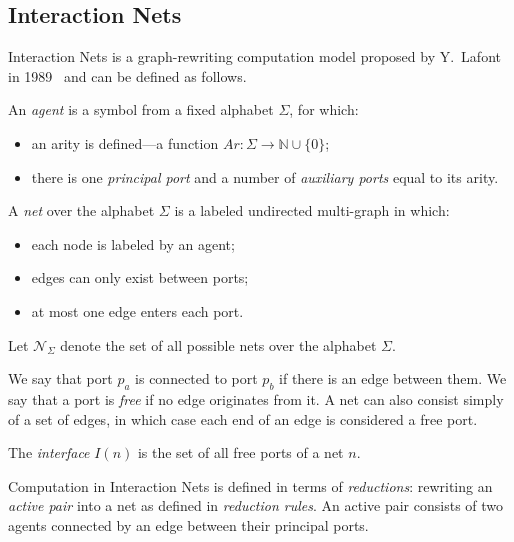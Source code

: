 \subsection{Interaction Nets}\label{sec:interaction_nets}

Interaction Nets is a graph-rewriting computation model proposed by Y.~Lafont in 1989~\cite{10.1145/96709.96718} and can be defined as follows.

\begin{definition}[Agent]
     An \textit{agent} is a symbol from a fixed alphabet $\Sigma$, for which:
\begin{itemize}
    \item an arity is defined---a function $Ar: \Sigma \to \mathbb{N} \cup \{0\}$;
    \item there is one \textit{principal port} and a number of \textit{auxiliary ports} equal to its arity.
\end{itemize}
\end{definition}

\begin{definition}[Net]
 A \textit{net} over the alphabet $\Sigma$ is a labeled undirected multi-graph in which:
\begin{itemize}
    \item each node is labeled by an agent;
    \item edges can only exist between ports;
    \item at most one edge enters each port.
\end{itemize}
\end{definition}

Let $\mathcal{N}_\Sigma$ denote the set of all possible nets over the alphabet $\Sigma$.

We say that port $p_a$ is connected to port $p_b$ if there is an edge between them.
We say that a port is \textit{free} if no edge originates from it.
A net can also consist simply of a set of edges, in which case each end of an edge is considered a free port.

\begin{definition}[Interface]
The \textit{interface} $I(n)$ is the set of all free ports of a net $n$.
\end{definition}

Computation in Interaction Nets is defined in terms of \textit{reductions}: rewriting an \textit{active pair} into a net as defined in \emph{reduction rules}.
An active pair consists of two agents connected by an edge between their principal ports.

